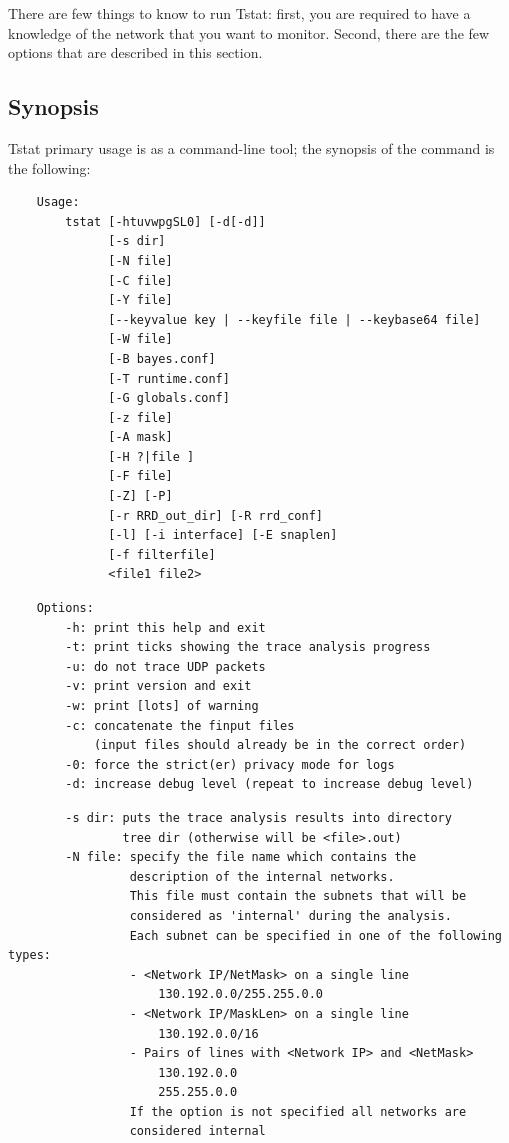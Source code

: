 \documentclass[11pt]{article}
\begin{document}
There are few things to know to run Tstat: first, you are required to have a
knowledge of the network that you want to monitor. 
Second, there are the few options that are described in this section.

\subsection{Synopsis\label{Synopsis}}


Tstat primary usage is as a command-line tool; the synopsis of 
the command is the following:

\begin{small}\begin{verbatim}
    Usage:
        tstat [-htuvwpgSL0] [-d[-d]]
              [-s dir]
              [-N file]
              [-C file]
              [-Y file]
              [--keyvalue key | --keyfile file | --keybase64 file]                                                              
              [-W file]
              [-B bayes.conf]
              [-T runtime.conf]
              [-G globals.conf]                                   
              [-z file]
              [-A mask]
              [-H ?|file ]
              [-F file]                                           
              [-Z] [-P]
              [-r RRD_out_dir] [-R rrd_conf]
              [-l] [-i interface] [-E snaplen]
              [-f filterfile]
              <file1 file2>
\end{verbatim}\end{small} \noindent
\begin{small}\begin{verbatim}
    Options:
        -h: print this help and exit
        -t: print ticks showing the trace analysis progress
        -u: do not trace UDP packets
        -v: print version and exit
        -w: print [lots] of warning
        -c: concatenate the finput files
            (input files should already be in the correct order)
        -0: force the strict(er) privacy mode for logs
        -d: increase debug level (repeat to increase debug level)
\end{verbatim}\end{small} \noindent
\begin{small}\begin{verbatim}
        -s dir: puts the trace analysis results into directory
                tree dir (otherwise will be <file>.out)
        -N file: specify the file name which contains the
                 description of the internal networks.
                 This file must contain the subnets that will be
                 considered as 'internal' during the analysis.
                 Each subnet can be specified in one of the following types:
                 - <Network IP/NetMask> on a single line 
                     130.192.0.0/255.255.0.0
                 - <Network IP/MaskLen> on a single line 
                     130.192.0.0/16
                 - Pairs of lines with <Network IP> and <NetMask>
                     130.192.0.0
                     255.255.0.0
                 If the option is not specified all networks are
                 considered internal
\end{verbatim}\end{small} \noindent
\end{document}
